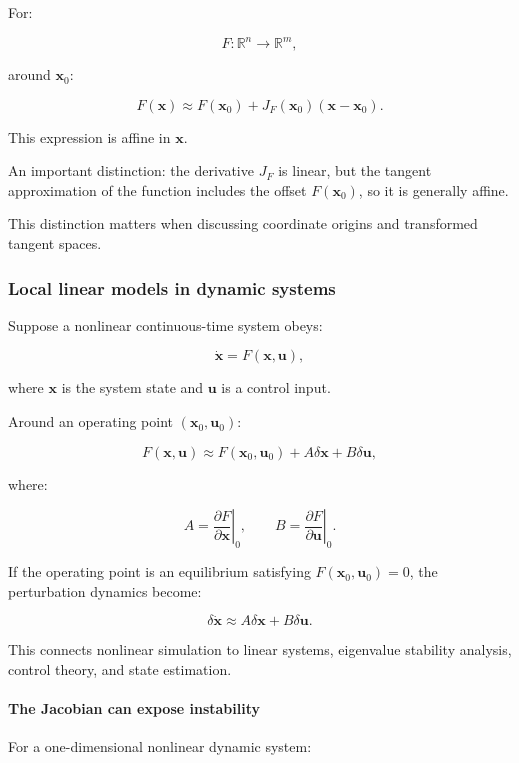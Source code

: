 For:

\[
F:\mathbb R^n\rightarrow\mathbb R^m,
\]

around \(\mathbf x_0\):

\[
\boxed{ F(\mathbf x)\approx F(\mathbf x_0)+ J_F(\mathbf x_0)(\mathbf x-\mathbf x_0) }.
\]

This expression is affine in \(\mathbf x\).

An important distinction: the derivative \(J_F\) is linear, but the tangent approximation of the function includes the offset \(F(\mathbf x_0)\), so it is generally affine.

This distinction matters when discussing coordinate origins and transformed tangent spaces.

\subsubsection{Local linear models in dynamic systems}\label{02-foundations-ii-ch021-local-linear-models-in-dynamic-systems}

Suppose a nonlinear continuous-time system obeys:

\[
\dot{\mathbf x}=F(\mathbf x,\mathbf u),
\]

where \(\mathbf x\) is the system state and \(\mathbf u\) is a control input.

Around an operating point \((\mathbf x_0,\mathbf u_0)\):

\[
F(\mathbf x,\mathbf u) \approx F(\mathbf x_0,\mathbf u_0) +A\delta\mathbf x+B\delta\mathbf u,
\]

where:

\[
A=\left.\frac{\partial F}{\partial\mathbf x}\right|_0, \qquad B=\left.\frac{\partial F}{\partial\mathbf u}\right|_0.
\]

If the operating point is an equilibrium satisfying \(F(\mathbf x_0,\mathbf u_0)=0\), the perturbation dynamics become:

\[
\delta\dot{\mathbf x}\approx A\delta\mathbf x+B\delta\mathbf u.
\]

This connects nonlinear simulation to linear systems, eigenvalue stability analysis, control theory, and state estimation.

\paragraph{The Jacobian can expose instability}\label{02-foundations-ii-ch021-the-jacobian-can-expose-instability}

For a one-dimensional nonlinear dynamic system:

